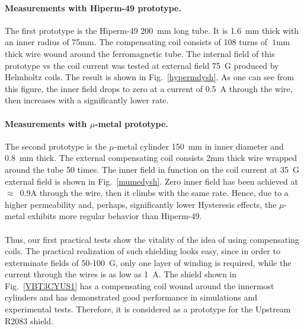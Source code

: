 \documentclass[12pt]{article}
\begin{document}
\paragraph{Measurements with Hiperm-49 prototype.}
The first prototype is the Hiperm-49 200~mm long tube. It is 1.6~mm thick with an inner radius of 
75mm. The compensating coil consists of 108 turns of $~1$mm thick wire wound around the 
ferromagnetic tube. The internal field of this  prototype vs the coil current 
was tested at external field 75~G  produced by Helmholtz coils. 
The result is shown  in Fig.~\ref{hypermdysh}. As one can see from this figure, the 
inner field drops to zero at a current of 0.5~A through the wire, then increases with  
a significantly lower rate.
\paragraph{Measurements with $\mu$-metal prototype.}
The second prototype is the $\mu$-metal cylinder  150~mm in inner  diameter and 0.8~mm  thick.
The external compensating coil consists 2mm thick wire wrapped around the tube 50 times.
The inner field in function on the coil current at 35~G  external field  is
shown  in Fig.~\ref{mumedysh}. Zero inner field has been achieved at   
$\approx$~0.9A through the wire, then it climbs with the same rate.  
Hence, due to a higher permeability and, perhaps, significantly  lower  
Hysteresis effects,  the $\mu$-metal exhibits more regular behavior than  Hiperm-49.
\paragraph{}
Thus, our first practical tests show the vitality of
the idea of using compensating coils. The practical realization of such 
shielding looks easy, since in order to exterminate fields of 50-100~G,
only one layer of winding is required, while the current through the wires
is as low as 1~A. 
The shield  shown in Fig.~\ref{VBT3CYUS1} has a compensating coil wound around the innermost cylinders and
has demonstrated good performance in simulations and experimental tests.
Therefore, it is considered as a prototype for the Upstream R2083 shield.
\end{document}
